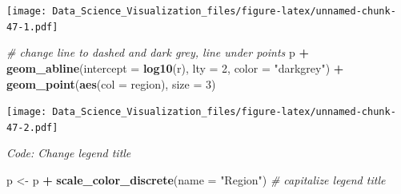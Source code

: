 \documentclass[
]{article}
\newenvironment{Shaded}{\begin{snugshade}}{\end{snugshade}}
\newcommand{\CommentTok}[1]{\textcolor[rgb]{0.56,0.35,0.01}{\textit{#1}}}
\newcommand{\DataTypeTok}[1]{\textcolor[rgb]{0.13,0.29,0.53}{#1}}
\newcommand{\DecValTok}[1]{\textcolor[rgb]{0.00,0.00,0.81}{#1}}
\newcommand{\KeywordTok}[1]{\textcolor[rgb]{0.13,0.29,0.53}{\textbf{#1}}}
\newcommand{\NormalTok}[1]{#1}
\newcommand{\OperatorTok}[1]{\textcolor[rgb]{0.81,0.36,0.00}{\textbf{#1}}}
\newcommand{\StringTok}[1]{\textcolor[rgb]{0.31,0.60,0.02}{#1}}
\begin{document}
\begin{Shaded}
\end{Shaded}

\texttt{[image: Data\_Science\_Visualization\_files/figure-latex/unnamed-chunk-47-1.pdf]}

\begin{Shaded}
\begin{Highlighting}[]
\CommentTok{# change line to dashed and dark grey, line under points}
\NormalTok{p }\OperatorTok{+}\StringTok{ }
\StringTok{    }\KeywordTok{geom_abline}\NormalTok{(}\DataTypeTok{intercept =} \KeywordTok{log10}\NormalTok{(r), }\DataTypeTok{lty =} \DecValTok{2}\NormalTok{, }\DataTypeTok{color =} \StringTok{"darkgrey"}\NormalTok{) }\OperatorTok{+}
\StringTok{    }\KeywordTok{geom_point}\NormalTok{(}\KeywordTok{aes}\NormalTok{(}\DataTypeTok{col =}\NormalTok{ region), }\DataTypeTok{size =} \DecValTok{3}\NormalTok{)}
\end{Highlighting}
\end{Shaded}

\texttt{[image: Data\_Science\_Visualization\_files/figure-latex/unnamed-chunk-47-2.pdf]}

\emph{Code: Change legend title}

\begin{Shaded}
\begin{Highlighting}[]
\NormalTok{p <-}\StringTok{ }\NormalTok{p }\OperatorTok{+}\StringTok{ }\KeywordTok{scale_color_discrete}\NormalTok{(}\DataTypeTok{name =} \StringTok{"Region"}\NormalTok{)    }\CommentTok{# capitalize legend title}
\end{Highlighting}
\end{Shaded}
\end{document}
